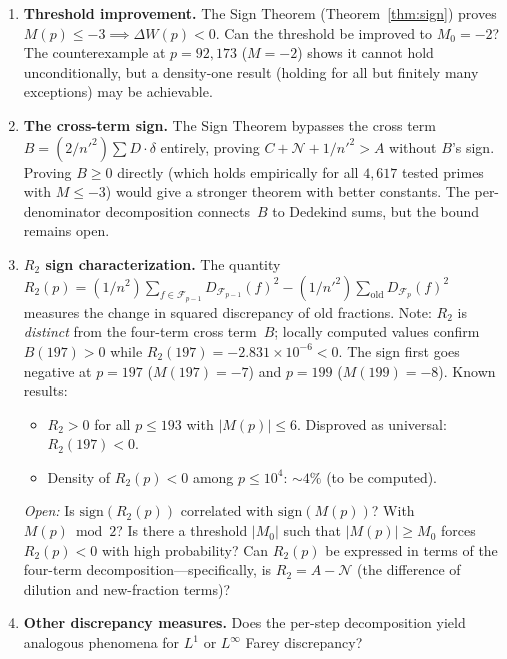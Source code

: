 \documentclass[11pt]{article}
\theoremstyle{definition}
\newcommand{\F}{\mathcal{F}}
\begin{document}
\begin{enumerate}
  \item \textbf{Threshold improvement.}
    The Sign Theorem (Theorem~\ref{thm:sign}) proves
    $M(p) \le -3 \implies \Delta W(p) < 0$.
    Can the threshold be improved to $M_0 = -2$?
    The counterexample at $p = 92{,}173$ ($M = -2$) shows it
    cannot hold unconditionally, but a density-one result
    (holding for all but finitely many exceptions) may be achievable.

  \item \textbf{The cross-term sign.}
    The Sign Theorem bypasses the cross term $B = (2/n'^2)\sum D
    \cdot \delta$ entirely, proving $C + \mathcal{N} + 1/{n'}^2 > A$ without
    $B$'s sign.  Proving $B \ge 0$ directly (which holds
    empirically for all $4{,}617$ tested primes with $M \le -3$)
    would give a stronger theorem with better constants.
    The per-denominator decomposition connects~$B$ to Dedekind
    sums, but the bound remains open.

  \item \textbf{$R_2$ sign characterization.}
    The quantity $R_2(p) = (1/n^2)\sum_{f\in\F_{p-1}} D_{\F_{p-1}}(f)^2 -
    (1/{n'}^2)\sum_{\text{old}} D_{\F_p}(f)^2$ measures the change in
    squared discrepancy of old fractions.  Note: $R_2$ is \emph{distinct}
    from the four-term cross term~$B$; locally computed values confirm
    $B(197) > 0$ while $R_2(197) = -2.831 \times 10^{-6} < 0$.
    The sign first goes negative at $p = 197$ ($M(197) = -7$) and
    $p = 199$ ($M(199) = -8$).  Known results:
    \begin{itemize}
    \item $R_2 > 0$ for all $p \le 193$ with $|M(p)| \le 6$. Disproved as universal: $R_2(197) < 0$.
    \item Density of $R_2(p) < 0$ among $p \le 10^4$: ${\sim}4\%$ (to be computed).
    \end{itemize}
    \emph{Open:} Is $\mathrm{sign}(R_2(p))$ correlated with $\mathrm{sign}(M(p))$?
    With $M(p) \bmod 2$?  Is there a threshold $|M_0|$ such that $|M(p)| \ge M_0$
    forces $R_2(p) < 0$ with high probability?  Can $R_2(p)$ be expressed
    in terms of the four-term decomposition---specifically, is $R_2 = A - \mathcal{N}$
    (the difference of dilution and new-fraction terms)?

  \item \textbf{Other discrepancy measures.}  Does the per-step
    decomposition yield analogous phenomena for $L^1$ or $L^\infty$
    Farey discrepancy?


\end{enumerate}
\end{document}
